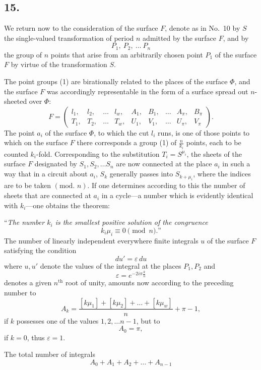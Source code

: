 \documentclass{article}
\begin{document}
\subsection*{15.}

We return now to the consideration of the surface $F$, denote as in No.~10 by $S$ the single-valued transformation of period $n$ admitted by the surface $F$, and by
\[
P_1, \ P_2, \ \dots \ P_n \tag{1}
\]
the group of $n$ points that arise from an arbitrarily chosen point $P_1$ of the surface $F$ by virtue of the transformation $S$.

The point groups (1) are birationally related to the places of the surface $\Phi$, and the surface $F$ was accordingly representable in the form of a surface spread out $n$-sheeted over $\Phi$:
\[
F = \begin{pmatrix}
l_1, & l_2, & \dots & l_w, & A_1, & B_1, & \dots & A_\pi, & B_\pi \\
T_1, & T_2, & \dots & T_w, & U_1, & V_1, & \dots & U_\pi, & V_\pi
\end{pmatrix}.
\]
The point $a_i$ of the surface $\Phi$, to which the cut $l_i$ runs, is one of those points to which on the surface $F$ there corresponds a group (1) of $\frac{n}{k_i}$ points, each to be counted $k_i$-fold. Corresponding to the substitution $T_i = S^{\mu_i}$, the sheets of the surface $F$ designated by $S_1, S_2, \dots S_n$ are now connected at the place $a_i$ in such a way that in a circuit about $a_i$, $S_k$ generally passes into $S_{k+\mu_i}$, where the indices are to be taken $(\text{mod. } n)$. If one determines according to this the number of sheets that are connected at $a_i$ in a cycle—a number which is evidently identical with $k_i$—one obtains the theorem:

``\emph{The number $k_i$ is the smallest positive solution of the congruence}
\[
k_i\mu_i \equiv 0 \pmod n\text{.''}
\]
The number of linearly independent everywhere finite integrals $u$ of the surface $F$ satisfying the condition
\[
du' = \varepsilon\,du
\]
where $u, u'$ denote the values of the integral at the places $P_1, P_2$ and
\[
\varepsilon = e^{-2i\pi\frac{k}{n}}
\]
denotes a given $n^{\text{th}}$ root of unity, amounts now according to the preceding number to
\[
A_k = \frac{[k\mu_1] + [k\mu_2] + \dots + [k\mu_w]}{n} + \pi - 1, \tag{2}
\]
if $k$ possesses one of the values $1, 2, \dots n-1$, but to
\[
A_0 = \pi, \tag{3}
\]
if $k = 0$, thus $\varepsilon = 1$.

The total number of integrals
\[
A_0 + A_1 + A_2 + \dots + A_{n-1}
\]
\end{document}
